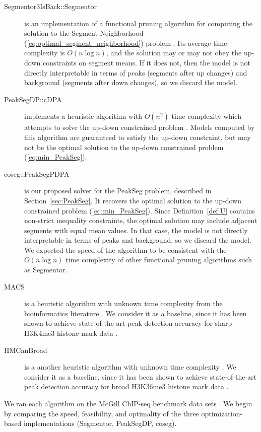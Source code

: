 \documentclass{article}
\begin{document}
\begin{description}
\item[Segmentor3IsBack::Segmentor] is an implementation of a
  functional pruning algorithm for computing the solution to the
  Segment Neighborhood (\ref{eq:optimal_segment_neighborhood}) problem
  \citep{Segmentor}. Its average time complexity is $O(n \log n)$,
  and the solution may or may not obey the up-down constraints on
  segment means. If it does not, then the model is not directly
  interpretable in terms of peaks (segments after up changes) and
  background (segments after down changes), so we discard the model.
\item[PeakSegDP::cDPA] implements a heuristic algorithm with $O(n^2)$
  time complexity which attempts to solve the up-down
  constrained problem \citep{HOCKING-PeakSeg}. Models computed by this
  algorithm are guaranteed to satisfy the up-down constraint, but may
  not be the optimal solution to the up-down constrained problem
  (\ref{eq:min_PeakSeg}).
\item[coseg::PeakSegPDPA] is our proposed solver for the PeakSeg
  problem, described in Section~\ref{sec:PeakSeg}. It recovers the
  optimal solution to the up-down constrained problem
  (\ref{eq:min_PeakSeg}).  Since Definition~\ref{def:U} contains
  non-strict inequality constraints, the optimal solution may include
  adjacent segments with equal mean values. In that case, the model is
  not directly interpretable in terms of peaks and background, so we
  discard the model. We expected the speed of the algorithm to be
  consistent with the $O(n\log n)$ time complexity of other functional
  pruning algorithms such as Segmentor.
\item[MACS] is a heuristic algorithm with unknown time complexity from
  the bioinformatics literature \citep{MACS}. We consider it as a
  baseline, since it has been shown to achieve state-of-the-art peak
  detection accuracy for sharp H3K4me3 histone mark data
  \citep{HOCKING-PeakSeg}.
\item[HMCanBroad] is a another heuristic algorithm with unknown time
  complexity \citep{HMCan}. We consider it as a baseline, since it has
  been shown to achieve state-of-the-art peak detection accuracy for
  broad H3K36me3 histone mark data \citep{HOCKING-PeakSeg}.
\end{description}

We ran each algorithm on the McGill ChIP-seq benchmark data sets
\citep{HOCKING2016-chipseq}. We begin by comparing the speed,
feasibility, and optimality of the three optimization-based
implementations (Segmentor, PeakSegDP, coseg).
\end{document}

